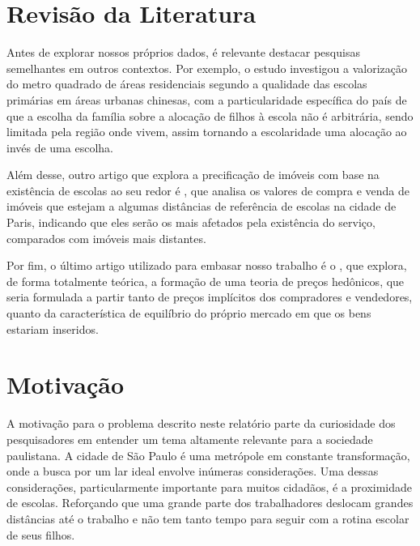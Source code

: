 \section{Revisão da Literatura}

Antes de explorar nossos próprios dados, é relevante destacar pesquisas semelhantes em outros contextos. Por exemplo, o estudo  \cite{chan2020valuing} investigou a valorização do metro quadrado de áreas residenciais segundo a qualidade das escolas primárias em áreas urbanas chinesas, com a particularidade específica do país de que a escolha da família sobre a alocação de filhos à escola não é arbitrária, sendo limitada pela região onde vivem, assim tornando a escolaridade uma alocação ao invés de uma escolha.

Além desse, outro artigo que explora a precificação de imóveis com base na existência de escolas ao seu redor é  \cite{fack2010better}, que analisa os valores de compra e venda de imóveis que estejam a algumas distâncias de referência de escolas na cidade de Paris, indicando que eles serão os mais afetados pela existência do serviço, comparados com imóveis mais distantes.

Por fim, o último artigo utilizado para embasar nosso trabalho é o  \cite{rosen1974hedonic}, que explora, de forma totalmente teórica, a formação de uma teoria de preços hedônicos, que seria formulada a partir tanto de preços implícitos dos compradores e vendedores, quanto da característica de equilíbrio do próprio mercado em que os bens estariam inseridos.


\section{Motivação}
A motivação para o problema descrito neste relatório parte da curiosidade dos pesquisadores em entender um tema altamente relevante para a sociedade paulistana. A cidade de São Paulo é uma metrópole em constante transformação, onde a busca por um lar ideal envolve inúmeras considerações. Uma dessas considerações, particularmente importante para muitos cidadãos, é a proximidade de escolas. Reforçando que uma grande parte dos trabalhadores deslocam grandes distâncias até o trabalho e não tem tanto tempo para seguir com a rotina escolar de seus filhos.


